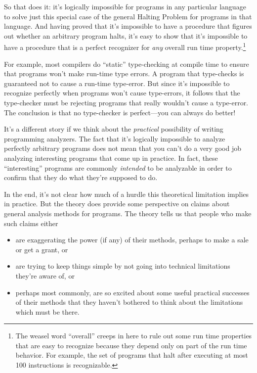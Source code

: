So that does it: it's logically impossible for programs in any
particular language to solve just this special case of the general
Halting Problem for programs in that language.  And having proved that
it's impossible to have a procedure that figures out whether an
arbitrary program halts, it's easy to show that it's impossible to
have a procedure that is a perfect recognizer for \emph{any} overall
run time property.\footnote{The weasel word ``overall'' creeps in here
  to rule out some run time properties that are easy to recognize
  because they depend only on part of the run time behavior.  For
  example, the set of programs that halt after executing at most 100
  instructions is recognizable.}

For example, most compilers do ``static'' type-checking at compile
time to ensure that programs won't make run-time type errors.  A program
that type-checks is guaranteed not to cause a run-time type-error.  But
since it's impossible to recognize perfectly when programs won't cause
type-errors, it follows that the type-checker must be rejecting programs
that really wouldn't cause a type-error.  The conclusion is that no
type-checker is perfect---you can always do better!

It's a different story if we think about the \emph{practical}
possibility of writing programming analyzers.  The fact that it's
logically impossible to analyze perfectly arbitrary programs does not
mean that you can't do a very good job analyzing interesting programs
that come up in practice.  In fact, these ``interesting'' programs are
commonly \emph{intended} to be analyzable in order to confirm that
they do what they're supposed to do.

In the end, it's not clear how much of a hurdle this theoretical limitation
implies in practice.  But the theory does provide some perspective
on claims about general analysis methods for programs.  The theory
tells us that people who make such claims either

\begin{itemize}
\item are exaggerating the power (if any) of their methods, perhaps to make a
  sale or get a grant, or

\item are trying to keep things simple by not going into technical
  limitations they're aware of, or

\item perhaps most commonly, are so excited about some useful practical
    successes of their methods that they haven't bothered to think about
    the limitations which must be there.
\end{itemize}

